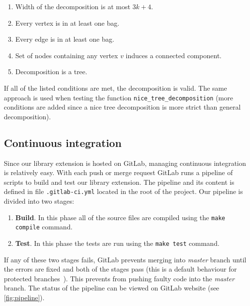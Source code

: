 \documentclass[thesis=B,english]{FITthesis}[2019/03/21]
\begin{document}
\begin{enumerate}
	\item Width of the decomposition is at most $3k+4$.
	\item Every vertex is in at least one bag.
	\item Every edge is in at least one bag.
	\item Set of nodes containing any vertex $v$ induces a connected component.
	\item Decomposition is a tree.
\end{enumerate}

If all of the listed conditions are met, the decomposition is valid. The same approach is used when testing the function \texttt{nice\_tree\_decomposition} (more conditions are added since a nice tree decomposition is more strict than general decomposition).

\subsection{Continuous integration}\label{ssec:ci}
Since our library extension is hosted on GitLab, managing continuous integration is relatively easy. With each push or merge request GitLab runs a pipeline of scripts to build and test our library extension. The pipeline and its content is defined in file \texttt{.gitlab-ci.yml} located in the root of the project.
\newpage
\noindent Our pipeline is divided into two stages:
\begin{enumerate}
	\item \textbf{Build}. In this phase all of the source files are compiled using the \texttt{make compile} command.
	\item \textbf{Test}. In this phase the tests are run using the \texttt{make test} command.
\end{enumerate}
If any of these two stages fails, GitLab prevents merging into \emph{master} branch until the errors are fixed and both of the stages pass (this is a default behaviour for protected branches~\cite{gitlab_ci}). This prevents from pushing faulty code into the \emph{master} branch. The status of the pipeline can be viewed on GitLab website (see \autoref{fig:pipeline}).
\end{document}
